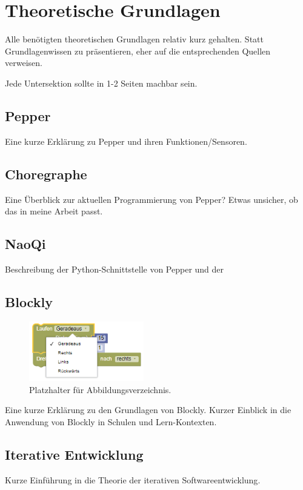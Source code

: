 \chapter{Theoretische Grundlagen} %
Alle benötigten theoretischen Grundlagen relativ kurz gehalten.
Statt Grundlagenwissen zu präsentieren, eher auf die entsprechenden Quellen verweisen.

Jede Untersektion sollte in 1-2 Seiten machbar sein.

\section{Pepper} %
Eine kurze Erklärung zu Pepper und ihren Funktionen/Sensoren.

\section{Choregraphe} %
Eine Überblick zur aktuellen Programmierung von Pepper?
Etwas unsicher, ob das in meine Arbeit passt.

\section{NaoQi} %
Beschreibung der Python-Schnittstelle von Pepper und der 

\section{Blockly} %
\begin{figure} %
	\centering
	\includegraphics[width=5cm]{Plots/zz-placeholder.png}
	\caption{Platzhalter für Abbildungsverzeichnis.}
	\label{fig:placeholder}
\end{figure}
Eine kurze Erklärung zu den Grundlagen von Blockly.
Kurzer Einblick in die Anwendung von Blockly in Schulen und Lern-Kontexten.\cite{Winterer2020ExpertRABIRP}

\section{Iterative Entwicklung} %
Kurze Einführung in die Theorie der iterativen Softwareentwicklung\cite{Arnowitz2010EffectivePSM}.
